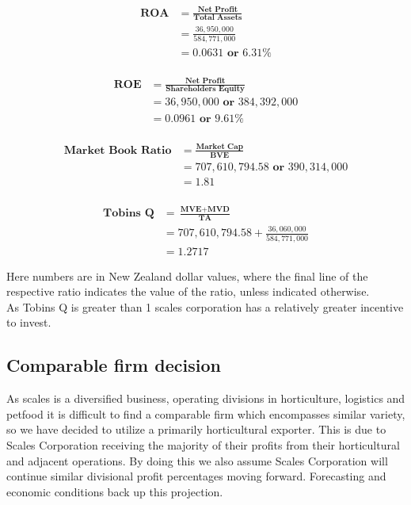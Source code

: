 \documentclass{article}
\begin{document}
\begin{equation*}
\begin{split}
\textbf{ROA} &= \frac{\textbf{Net Profit}}{\textbf{Total Assets}} \\
             &= \frac{36,950,000}{584,771,000} \\
             &= 0.0631 \textbf{ or } 6.31\% \\
\end{split}
\end{equation*}

\begin{equation*}
\begin{split}
\textbf{ROE} &= \frac{\textbf{Net Profit}}{\textbf{Shareholders Equity}} \\
             &= 36,950,000 \textbf{ or } 384,392,000 \\
             &= 0.0961 \textbf{ or } 9.61\% \\
\end{split}
\end{equation*}

\begin{equation*}
\begin{split}
\textbf{Market Book Ratio} &= \frac{\textbf{Market Cap}}{\textbf{BVE}}  \\
                           &=707,610,794.58 \textbf{ or } 390,314,000 \\
                           &= 1.81 \\
\end{split}
\end{equation*}

\begin{equation*}
\begin{split}
\textbf{Tobins Q}  &= \frac{\textbf{MVE} + \textbf{MVD}}{\textbf{TA}}\\
                   &= 707,610,794.58 + \frac{36,060,000}{584,771,000}\\ 
                   &= 1.2717 
\end{split}
\end{equation*}

Here numbers are in New Zealand dollar values, where the final line of the respective ratio indicates the value of the ratio, unless indicated otherwise.\\
As Tobins Q is greater than 1 scales corporation has a relatively greater incentive to invest. 

\subsection{Comparable firm decision}  
As scales is a diversified business, operating divisions in horticulture, logistics and petfood it is difficult to find a comparable firm which encompasses similar variety, so we have decided to utilize a primarily horticultural exporter. This is due to Scales Corporation receiving the majority of their profits from their horticultural and adjacent operations. By doing this we also assume Scales Corporation will continue similar divisional profit percentages moving forward. Forecasting and economic conditions back up this projection.\\
\end{document}
